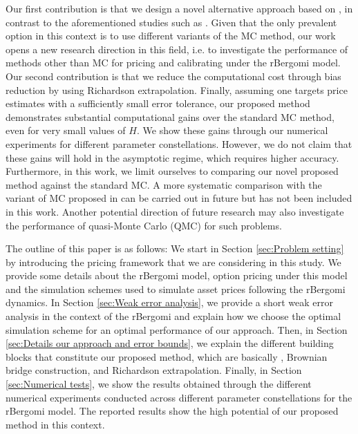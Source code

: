Our first contribution is that we design a novel alternative approach based on , in contrast to the aforementioned studies such as \cite{mccrickerd2018turbocharging}. Given that the only prevalent option in this context is to use different variants of the MC method, our work opens a new  research direction in this field, i.e.  to investigate the performance of methods other than MC for pricing and calibrating under the rBergomi model. Our second contribution is that we reduce the computational cost  through bias reduction by using Richardson extrapolation. Finally, assuming one targets price estimates with a sufficiently small  error tolerance, our proposed method demonstrates substantial computational gains  over the standard MC method, even for very small values of  $H$. We show  these gains through our numerical experiments for  different parameter constellations. However, we do not claim that these gains will hold in the asymptotic regime, which requires higher accuracy. Furthermore,  in this work, we limit ourselves to comparing our novel proposed method against the standard MC. A more systematic comparison with the variant of MC proposed in \cite{mccrickerd2018turbocharging}  can be carried out in future but has not been included in this work. Another potential direction of future research may also investigate the performance of quasi-Monte Carlo (QMC) for such problems.

The outline of this paper is as follows: We start in Section \ref{sec:Problem setting} by  introducing  the pricing framework that we are considering in this study. We provide some details about the rBergomi model, option pricing under this model and the simulation schemes used to simulate asset prices following the rBergomi dynamics. In Section \ref{sec:Weak error analysis}, we provide a short weak error analysis in the context of the rBergomi  and explain how we choose the optimal simulation scheme for an optimal performance of our approach. Then, in Section \ref{sec:Details our approach and error bounds}, we explain the different building blocks that constitute our proposed method, which are basically , Brownian bridge construction, and Richardson extrapolation. Finally, in Section \ref{sec:Numerical tests}, we show the results obtained through the different numerical experiments conducted across different parameter constellations for the rBergomi model. The reported results show the high potential of our proposed method in this context.


